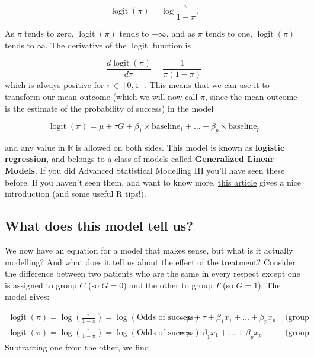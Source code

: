 \documentclass[
  openany]{book}
\theoremstyle{definition}
\theoremstyle{definition}
\theoremstyle{definition}
\theoremstyle{definition}
\theoremstyle{remark}
\begin{document}
\[\operatorname{logit}\left(\pi\right) = \log\frac{\pi}{1-\pi}.\]

As \(\pi\) tends to zero, \(\operatorname{logit}\left(\pi\right)\) tends to \(-\infty\), and as \(\pi\) tends to one, \(\operatorname{logit}\left(\pi\right)\) tends to \(\infty\). The derivative of the \(\operatorname{logit}\) function is

\[ \frac{d\operatorname{logit}\left(\pi\right)}{d\pi} = \frac{1}{\pi\left(1-\pi\right)}\]
which is always positive for \(\pi\in\left[0,1\right]\). This means that we can use it to transform our mean outcome (which we will now call \(\pi\), since the mean outcome is the estimate of the probability of success) in the model

\begin{equation}
\operatorname{logit}\left(\pi\right) = \mu + \tau G + \beta_1\times{\text{baseline}_{1}} + \ldots + \beta_p\times{\text{baseline}_{p}}
\label{eq:logreg1}
\end{equation}

and any value in \(\mathbb{R}\) is allowed on both sides. This model is known as \textbf{logistic regression}, and belongs to a class of models called \textbf{Generalized Linear Models}. If you did Advanced Statistical Modelling III you'll have seen these before. If you haven't seen them, and want to know more, \href{https://www.r-bloggers.com/2015/08/generalised-linear-models-in-r/}{this article} gives a nice introduction (and some useful R tips!).

\hypertarget{what-does-this-model-tell-us}{%
\subsection{What does this model tell us?}\label{what-does-this-model-tell-us}}

We now have an equation for a model that makes sense, but what is it actually modelling? And what does it tell us about the effect of the treatment?
Consider the difference between two patients who are the same in every respect except one is assigned to group \(C\) (so \(G=0\)) and the other to group \(T\) (so \(G=1\)). The model gives:

\[
\begin{aligned}
\operatorname{logit}\left(\pi\right) = \log\left(\frac{\pi}{1-\pi}\right) = \log\left(\text{Odds of success}\right) & = \mu + \tau + \beta_1x_1 + \ldots + \beta_px_p & \text{ (group T)}\\
\operatorname{logit}\left(\pi\right) = \log\left(\frac{\pi}{1-\pi}\right) = \log\left(\text{Odds of success}\right) & = \mu + \beta_1x_1 + \ldots + \beta_px_p & \text{ (group C)}
\end{aligned}
\]
Subtracting one from the other, we find
\end{document}
